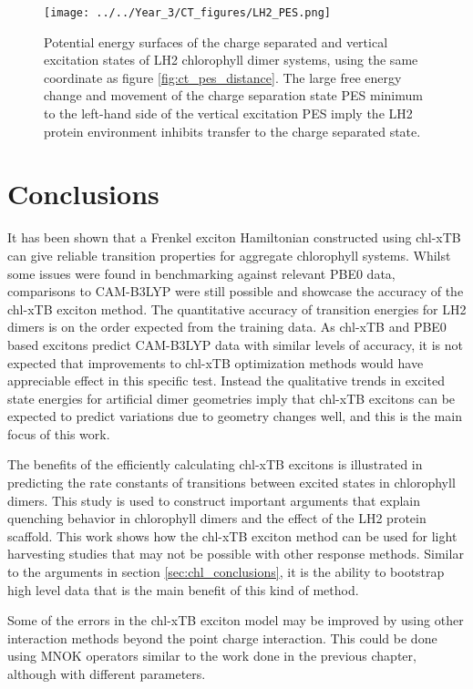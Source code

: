 \begin{figure}
    \centering
    \texttt{[image: ../../Year\_3/CT\_figures/LH2\_PES.png]}
    \caption{Potential energy surfaces of the charge separated and vertical excitation
    states of LH2 chlorophyll dimer systems, using the same coordinate as figure
    \ref{fig:ct_pes_distance}. The large free energy change and movement of the 
    charge separation state PES minimum to the left-hand side of the vertical excitation 
    PES imply the LH2 protein environment inhibits transfer to the charge separated
    state.}
    \label{fig:ct_pes_lh2}
\end{figure}

\section{Conclusions}
\label{sec:exciton_concs}

It has been shown that a Frenkel exciton Hamiltonian constructed using chl-xTB can
give reliable transition properties for aggregate chlorophyll systems. Whilst some
issues were found in benchmarking against relevant PBE0 data, comparisons to CAM-B3LYP 
were still possible and showcase the accuracy of the chl-xTB exciton method. The
quantitative accuracy of transition energies for LH2 dimers is on the order expected
from the training data. As chl-xTB and PBE0 based excitons predict CAM-B3LYP data
with similar levels of accuracy, it is not expected that improvements to chl-xTB
optimization methods would have appreciable effect in this specific test. Instead
the qualitative trends in excited state energies for artificial dimer geometries
imply that chl-xTB excitons can be expected to predict variations due to geometry 
changes well, and this is the main focus of this work.

The benefits of the efficiently calculating chl-xTB excitons is illustrated in 
predicting the rate constants of transitions between excited states in chlorophyll
dimers. This study is used to construct important arguments that explain quenching
behavior in chlorophyll dimers and the effect of the LH2 protein scaffold. This work
shows how the chl-xTB exciton method can be used for light harvesting studies that 
may not be possible with other response methods. Similar to the arguments in section
\ref{sec:chl_conclusions}, it is the ability to bootstrap high level data that is
the main benefit of this kind of method.

Some of the errors in the chl-xTB exciton model may be improved by using other interaction
methods beyond the point charge interaction. This could be done using MNOK operators
similar to the work done in the previous chapter, although with different parameters.

